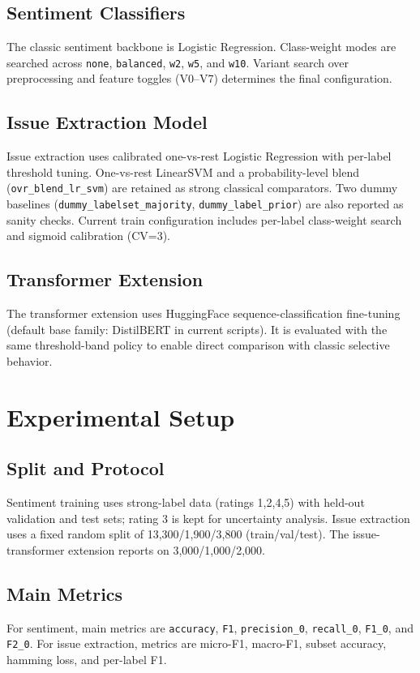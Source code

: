 \documentclass[12pt,a4paper]{article}
\begin{document}
\subsection{Sentiment Classifiers}
The classic sentiment backbone is Logistic Regression. Class-weight modes are searched across \texttt{none}, \texttt{balanced}, \texttt{w2}, \texttt{w5}, and \texttt{w10}. Variant search over preprocessing and feature toggles (V0--V7) determines the final configuration.

\subsection{Issue Extraction Model}
Issue extraction uses calibrated one-vs-rest Logistic Regression with per-label threshold tuning. One-vs-rest LinearSVM and a probability-level blend (\texttt{ovr\_blend\_lr\_svm}) are retained as strong classical comparators. Two dummy baselines (\texttt{dummy\_labelset\_majority}, \texttt{dummy\_label\_prior}) are also reported as sanity checks. Current train configuration includes per-label class-weight search and sigmoid calibration (CV=3).

\subsection{Transformer Extension}
The transformer extension uses HuggingFace sequence-classification fine-tuning (default base family: DistilBERT in current scripts). It is evaluated with the same threshold-band policy to enable direct comparison with classic selective behavior.

\section{Experimental Setup}
\subsection{Split and Protocol}
Sentiment training uses strong-label data (ratings 1,2,4,5) with held-out validation and test sets; rating 3 is kept for uncertainty analysis. Issue extraction uses a fixed random split of 13,300/1,900/3,800 (train/val/test). The issue-transformer extension reports on 3,000/1,000/2,000.

\subsection{Main Metrics}
For sentiment, main metrics are \texttt{accuracy}, \texttt{F1}, \texttt{precision\_0}, \texttt{recall\_0}, \texttt{F1\_0}, and \texttt{F2\_0}. For issue extraction, metrics are micro-F1, macro-F1, subset accuracy, hamming loss, and per-label F1.
\end{document}
